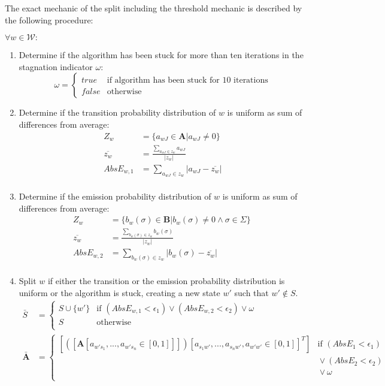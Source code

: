 The exact mechanic of the split including the threshold mechanic is described by the following procedure:

$\forall w\in\mathcal{W}:$
\begin{enumerate}
	\item Determine if the algorithm has been stuck for more than ten iterations in the stagnation indicator $\omega$:
	$$ \omega = \begin{cases}
true &\text{if algorithm has been stuck for 10 iterations} \\
false &\text{otherwise}
\end{cases} $$
\item Determine if the transition probability distribution of $w$ is uniform as sum of differences from average:
\begin{align*}
Z_w &= \{a_{wJ} \in \mathbf{A} \vert a_{wJ} \neq 0\} \\
\overline{z_w} &= \frac{\sum_{a_{wJ} \in z_w} a_{wJ}}{\vert z_w \vert} \\
AbsE_{w,1} &= \sum_{a_{wJ} \in z_w} \vert a_{wJ} - \overline{z_w} \vert \\
\end{align*}
\item Determine if the emission probability distribution of $w$ is uniform as sum of differences from average:
\begin{align*}
Z_w &= \{b_{w}(\sigma) \in \mathbf{B} \vert b_{w}(\sigma) \neq 0 \wedge \sigma \in \Sigma\} \ \\
\overline{z_w} &= \frac{\sum_{b_{w}(\sigma) \in z_w} b_{w}(\sigma)}{\vert z_w \vert} \\
AbsE_{w,2} &= \sum_{b_{w}(\sigma) \in z_w} \vert b_{w}(\sigma) - \overline{z_w} \vert \\
\end{align*}
\item Split $w$ if either the transition or the emission probability distribution is uniform or the algorithm is stuck, creating a new state $w'$ such that $w'\notin S$.
\begin{align*}
\bar{S} &= \begin{cases}
S \cup \{ w' \} &\text{if } (AbsE_{w,1} < \epsilon_1) \vee (AbsE_{w,2} < \epsilon_2) \vee \omega\\
S &\text{otherwise} \\
\end{cases} \\
\mathbf{\bar{A}} &= \begin{cases}
[([\mathbf{A} [a_{w's_1},  ... , a_{w's_n} \in [0,1]]])[a_{s_1w'},  ... , a_{s_nw'}, a_{w'w'} \in [0, 1]]^T] &\text{if } (AbsE_1 < \epsilon_1)\\&\text{}\vee (AbsE_2 < \epsilon_2)\\&\text{}\vee \omega\\

\end{cases}
\end{align*}
\end{enumerate}
